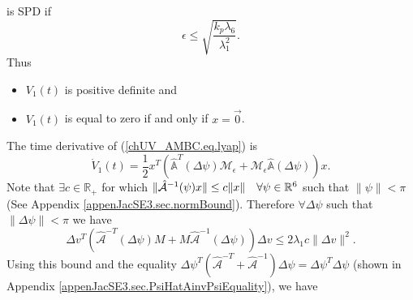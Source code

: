 %
is \ac{SPD} if 
%
\begin{equation}
\epsilon \leq \sqrt{\frac{k_p \lambda_6}{\lambda_1^{2}}}.
\end{equation}
%
Thus
%
\begin{itemize}
\item $V_1(t)$ is positive definite and
\item $V_1(t)$ is equal to zero if and only if $x=\vec{0}$.
\end{itemize}


The time derivative of (\ref{chUV_AMBC.eq.lyap}) is 
%
\begin{equation} \label{chUV_AMBC.eq.lyap_dot}
\dot{V}_1(t)=\frac{1}{2}
x^T\left(\hat{\mathbb{A}}^{T}(\Delta\psi)\mathcal{M}_\epsilon 
        +\mathcal{M}_\epsilon\hat{\mathbb{A}}(\Delta\psi)\right) x.
\end{equation}
% 
Note that $\exists c\in\mathbb{R}_+$ for which
$\|\hat{\mathcal{A}}^{-1}(\psi) x\| \leq c\|x\|\quad\forall\psi\in\mathbb{R}^{6}$ such that $\|\psi\|<\pi$ (See Appendix
\ref{appenJacSE3.sec.normBound}).  Therefore $\forall \Delta \psi$
such that $\|\Delta\psi\|<\pi$ we have
%
%
\begin{equation}
\Delta
v^T \left(\hat{\mathcal{A}}^{-T}(\Delta\psi) M +M \hat{\mathcal{A}}^{-1}(\Delta \psi)
  \right)\Delta v \leq 2 \lambda_1 c \|\Delta v\|^2.
\end{equation}
%
%
Using this bound and the equality
$\Delta\psi^T\left(\hat{\mathcal{A}}^{-T}+\hat{\mathcal{A}}^{-1}\right)\Delta
\psi=\Delta\psi^T\Delta\psi$ (shown in Appendix
\ref{appenJacSE3.sec.PsiHatAinvPsiEquality}), we have
%
